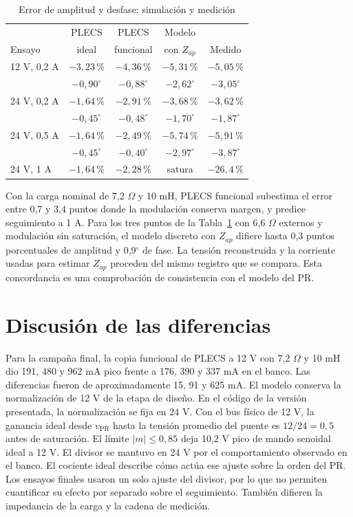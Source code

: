 \documentclass[conference]{IEEEtran}
\begin{document}
\begin{table}[H]\caption{Error de amplitud y desfase: simulación y medición}\centering\small
\begin{tabular}{@{}lcccc@{}}\toprule
 & PLECS & PLECS & Modelo & \\
Ensayo & ideal & funcional & con $Z_{ap}$ & Medido\\\midrule
12 V, 0,2 A & $-3{,}23$\,\% & $-4{,}36$\,\% & $-5{,}31$\,\% & $-5{,}05$\,\%\\
 & $-0{,}90^\circ$ & $-0{,}88^\circ$ & $-2{,}62^\circ$ & $-3{,}05^\circ$\\
24 V, 0,2 A & $-1{,}64$\,\% & $-2{,}91$\,\% & $-3{,}68$\,\% & $-3{,}62$\,\%\\
 & $-0{,}45^\circ$ & $-0{,}48^\circ$ & $-1{,}70^\circ$ & $-1{,}87^\circ$\\
24 V, 0,5 A & $-1{,}64$\,\% & $-2{,}49$\,\% & $-5{,}74$\,\% & $-5{,}91$\,\%\\
 & $-0{,}45^\circ$ & $-0{,}40^\circ$ & $-2{,}97^\circ$ & $-3{,}87^\circ$\\
24 V, 1 A & $-1{,}64$\,\% & $-2{,}28$\,\% & satura & $-26{,}4$\,\%\\\bottomrule
\end{tabular}\label{tab:comparacion}\end{table}

Con la carga nominal de 7,2 $\Omega$ y 10 mH, PLECS funcional subestima el error entre 0,7 y 3,4 puntos donde la modulación conserva margen, y predice seguimiento a 1 A. Para los tres puntos de la Tabla~\ref{tab:comparacion} con 6,6 $\Omega$ externos y modulación sin saturación, el modelo discreto con $Z_{ap}$ difiere hasta 0,3 puntos porcentuales de amplitud y 0,9$^\circ$ de fase. La tensión reconstruida y la corriente usadas para estimar $Z_{ap}$ proceden del mismo registro que se compara. Esta concordancia es una comprobación de consistencia con el modelo del PR.

\section{Discusión de las diferencias}
\label{sec:discusion}
Para la campaña final, la copia funcional de PLECS a 12 V con 7,2 $\Omega$ y 10 mH dio 191, 480 y 962 mA pico frente a 176, 390 y 337 mA en el banco. Las diferencias fueron de aproximadamente 15, 91 y 625 mA. El modelo conserva la normalización de 12 V de la etapa de diseño. En el código de la versión presentada, la normalización se fija en 24 V. Con el bus físico de 12 V, la ganancia ideal desde $v_{\mathrm{PR}}$ hasta la tensión promedio del puente es $12/24=0{,}5$ antes de saturación. El límite $|m|\leq0{,}85$ deja 10,2 V pico de mando senoidal ideal a 12 V. El divisor se mantuvo en 24 V por el comportamiento observado en el banco. El cociente ideal describe cómo actúa ese ajuste sobre la orden del PR. Los ensayos finales usaron un solo ajuste del divisor, por lo que no permiten cuantificar su efecto por separado sobre el seguimiento. También difieren la impedancia de la carga y la cadena de medición.
\end{document}
